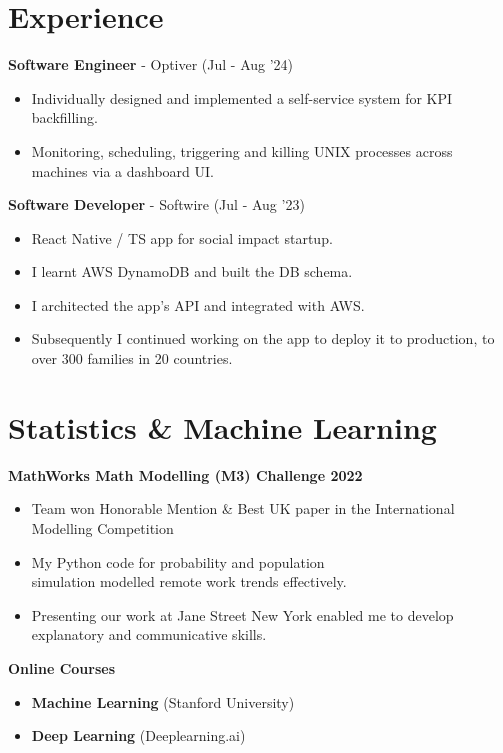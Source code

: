 \documentclass{Resume}
\begin{document}
        \section{Experience}
            \textbf{Software Engineer} - Optiver \hfill (Jul - Aug '24)
                \begin{itemize}
                    \item Individually designed and implemented a self-service system for KPI backfilling.
                    \item Monitoring, scheduling, triggering and killing UNIX processes across machines via a dashboard UI.
                \end{itemize}            
            \textbf{Software Developer} - Softwire \hfill (Jul - Aug '23)
            \begin{itemize}
                \item React Native / TS app for social impact startup.
                \item I learnt AWS DynamoDB and built the DB schema.
                \item I architected the app's API and integrated with AWS.
                \item Subsequently I continued working on the app to deploy it to production, to over 300 families in 20 countries.  

            \end{itemize}

	\section{Statistics \& Machine Learning}
			\textbf{MathWorks Math Modelling (M3) Challenge 2022} 
			\begin{itemize}
                \item Team won Honorable Mention \& Best UK paper in the International Modelling Competition
			    \item My Python code for probability and population \\ simulation modelled remote work trends effectively.
			    \item Presenting our work at Jane Street New York enabled me to develop explanatory and communicative skills.
			\end{itemize}
            \textbf{Online Courses}
                \begin{itemize}
                    \item \textbf{Machine Learning} (Stanford University)
                    \item \textbf{Deep Learning} (Deeplearning.ai)
                \end{itemize}
\end{document}
